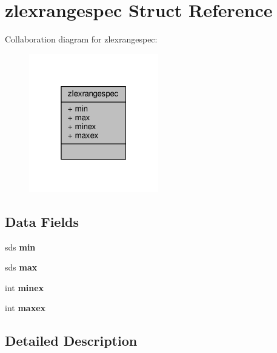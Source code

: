 \hypertarget{structzlexrangespec}{}\section{zlexrangespec Struct Reference}
\label{structzlexrangespec}


Collaboration diagram for zlexrangespec\+:\nopagebreak
\begin{figure}[H]
\begin{center}
\leavevmode
\includegraphics[width=160pt]{structzlexrangespec__coll__graph}
\end{center}
\end{figure}
\subsection*{Data Fields}
\begin{DoxyCompactItemize}
\item 
\mbox{\label{structzlexrangespec_a8ef5086f1b2ad8c416afc396272e5e2f}} 
sds {\bfseries min}
\item 
\mbox{\label{structzlexrangespec_acac503c865c2d0e90934ae264ff02672}} 
sds {\bfseries max}
\item 
\mbox{\label{structzlexrangespec_a238a550976132316a888b6fa8c3e1cd8}} 
int {\bfseries minex}
\item 
\mbox{\label{structzlexrangespec_af73a17bf171634f859491e8e1573c4e6}} 
int {\bfseries maxex}
\end{DoxyCompactItemize}


\subsection{Detailed Description}


